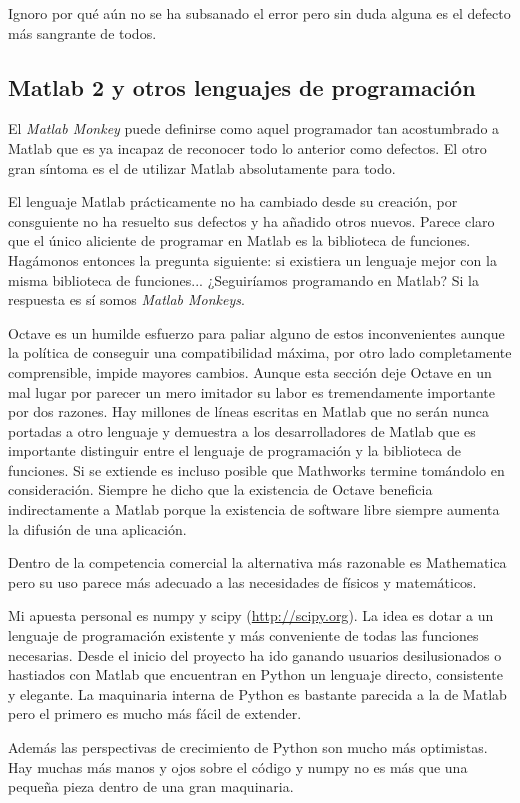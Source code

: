 Ignoro por qué aún no se ha subsanado el error pero sin duda alguna es
el defecto más sangrante de todos.

\subsection{Matlab 2 y otros lenguajes de programación}

El \emph{Matlab Monkey} puede definirse como aquel programador tan
acostumbrado a Matlab que es ya incapaz de reconocer todo lo anterior
como defectos.  El otro gran síntoma es el de utilizar Matlab
absolutamente para todo.

El lenguaje Matlab prácticamente no ha cambiado desde su creación, por
consguiente no ha resuelto sus defectos y ha añadido otros
nuevos. Parece claro que el único aliciente de programar en Matlab es
la biblioteca de funciones.  Hagámonos entonces la pregunta siguiente:
si existiera un lenguaje mejor con la misma biblioteca de
funciones... ¿Seguiríamos programando en Matlab?  Si la respuesta es
sí somos \emph{Matlab Monkeys}.

Octave es un humilde esfuerzo para paliar alguno de estos
inconvenientes aunque la política de conseguir una compatibilidad
máxima, por otro lado completamente comprensible, impide mayores
cambios.  Aunque esta sección deje Octave en un mal lugar por parecer
un mero imitador su labor es tremendamente importante por dos
razones. Hay millones de líneas escritas en Matlab que no serán nunca
portadas a otro lenguaje y demuestra a los desarrolladores de Matlab
que es importante distinguir entre el lenguaje de programación y la
biblioteca de funciones.  Si se extiende es incluso posible que
Mathworks termine tomándolo en consideración. Siempre he dicho que la
existencia de Octave beneficia indirectamente a Matlab porque la
existencia de software libre siempre aumenta la difusión de una
aplicación.

Dentro de la competencia comercial la alternativa más
razonable es Mathematica pero su uso parece más adecuado a las
necesidades de físicos y matemáticos.

Mi apuesta personal es numpy y scipy (\url{http://scipy.org}). La idea
es dotar a un lenguaje de programación existente y más conveniente de
todas las funciones necesarias. Desde el inicio del proyecto ha ido
ganando usuarios desilusionados o hastiados con Matlab que encuentran
en Python un lenguaje directo, consistente y elegante.  La maquinaria
interna de Python es bastante parecida a la de Matlab pero el primero
es mucho más fácil de extender.

Además las perspectivas de crecimiento de Python son mucho más
optimistas.  Hay muchas más manos y ojos sobre el código y numpy no es
más que una pequeña pieza dentro de una gran maquinaria.
